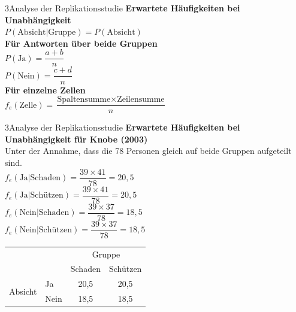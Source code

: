\documentclass[xcolor=table,9pt,aspectratio=169]{beamer}
\begin{document}
\begin{frame}{\vspace*{10mm}3\hspace*{1em}Analyse der Replikationsstudie}
\textbf{Erwartete Häufigkeiten bei Unabhängigkeit}\\
\smallskip
$P(\text{Absicht}|\text{Gruppe})=P(\text{Absicht})$\\

\bigskip
\textbf{Für Antworten über beide Gruppen}\\
\smallskip
$P(\text{Ja})=\dfrac{a+b}{n}$\\
\smallskip
$P(\text{Nein})=\dfrac{c+d}{n}$\\

\bigskip
\textbf{Für einzelne Zellen}\\
\smallskip
$f_{e}(\text{Zelle})=\dfrac{\text{Spaltensumme}\times\text{Zeilensumme}}{n}$\\
\end{frame}


\begin{frame}{\vspace*{10mm}3\hspace*{1em}Analyse der Replikationsstudie}
\textbf{Erwartete Häufigkeiten bei Unabhängigkeit für Knobe (2003)}\\
\smallskip
Unter der Annahme, dass die 78 Personen gleich auf beide Gruppen aufgeteilt sind.\\
\smallskip
$f_{e}(\text{Ja}|\text{Schaden})=\dfrac{39\times41}{78}=20,5$\\
\smallskip
$f_{e}(\text{Ja}|\text{Schützen})=\dfrac{39\times41}{78}=20,5$\\
\smallskip
$f_{e}(\text{Nein}|\text{Schaden})=\dfrac{39\times37}{78}=18,5$\\
\smallskip
$f_{e}(\text{Nein}|\text{Schützen})=\dfrac{39\times37}{78}=18,5$\\

\bigskip
\begin{tabular}{llcc}
   \arrayrulecolor{blue2}\hline
                              &        & \multicolumn{2}{c}{Gruppe}   \\
                              &        & Schaden   & Schützen         \\
   \hline
   \multirow{2}{*}{Absicht}   & Ja     & 20,5      & 20,5             \\
                              & Nein   & 18,5      & 18,5             \\
   \hline
\end{tabular}
\end{frame}
\end{document}
